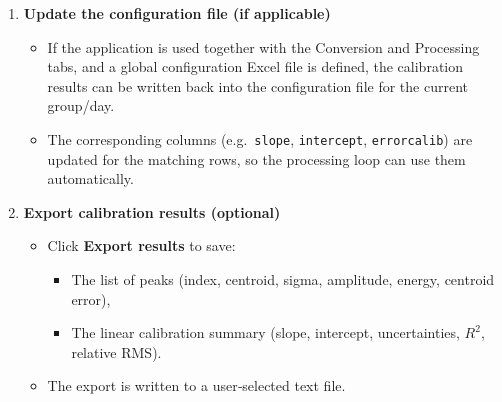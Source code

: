 \begin{enumerate}
\begin{itemize}
    \begin{itemize}
    \tightlist
    \item
      Slope \(a\) and intercept \(b\),\\
    \item
      Uncertainties on \(a\) and \(b\),\\
    \item
      Coefficient of determination \(R^2\),\\
    \item
      Global RMS error and relative RMS (in \%).\\
    \end{itemize}
  \item
    A summary string is displayed in the calibration result label and in
    the text area.
  \end{itemize}
\item
  \textbf{Update the configuration file (if applicable)}

  \begin{itemize}
  \tightlist
  \item
    If the application is used together with the Conversion and
    Processing tabs, and a global configuration Excel file is defined,
    the calibration results can be written back into the configuration
    file for the current group/day.\\
  \item
    The corresponding columns (e.g.~\texttt{slope}, \texttt{intercept},
    \texttt{errorcalib}) are updated for the matching rows, so the
    processing loop can use them automatically.
  \end{itemize}
\item
  \textbf{Export calibration results (optional)}

  \begin{itemize}
  \tightlist
  \item
    Click \textbf{Export results} to save:

    \begin{itemize}
    \tightlist
    \item
      The list of peaks (index, centroid, sigma, amplitude, energy,
      centroid error),\\
    \item
      The linear calibration summary (slope, intercept, uncertainties,
      \(R^2\), relative RMS).\\
    \end{itemize}
  \item
    The export is written to a user‑selected text file.
  \end{itemize}
\end{enumerate}

